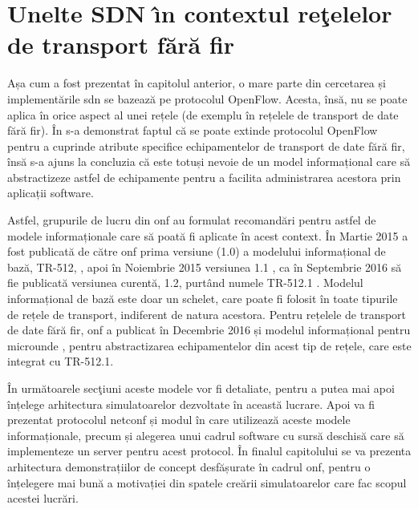 \chapter{Unelte SDN \^{\i}n contextul reţelelor de transport fără fir\label{ch:sdn_in_contextul_wt}}

\graphicspath{ {cap-sdn_in_contextul_wt/figures/} }

Așa cum a fost prezentat în capitolul anterior, o mare parte din cercetarea și implementările \gls{sdn} se bazează pe protocolul OpenFlow. Acesta, însă, nu se poate aplica în orice aspect al unei rețele (de exemplu în rețelele de transport de date fără fir). În \cite{onf2015_poc1} s-a demonstrat faptul că se poate extinde protocolul OpenFlow pentru a cuprinde atribute specifice echipamentelor de transport de date fără fir, însă s-a ajuns la concluzia că este totuși nevoie de un model informațional care să abstractizeze astfel de echipamente pentru a facilita administrarea acestora prin aplicații software. 

Astfel, grupurile de lucru din \gls{onf} au formulat recomandări pentru astfel de modele informaționale care să poată fi aplicate în acest context. În Martie 2015 a fost publicată de către \gls{onf} prima versiune (1.0) a modelului informațional de bază, TR-512, \cite{onftr512v1.0}, apoi în Noiembrie 2015 versiunea 1.1 \cite{onftr512v1.1}, ca în Septembrie 2016 să fie publicată versiunea curentă, 1.2, purtând numele TR-512.1 \cite{onftr512v1.2}. Modelul informațional de bază este doar un schelet, care poate fi folosit în toate tipurile de rețele de transport, indiferent de natura acestora. Pentru rețelele de transport de date fără fir, \gls{onf} a publicat în Decembrie 2016 și modelul informațional pentru microunde \cite{onftr532}, pentru abstractizarea echipamentelor din acest tip de rețele, care este integrat cu TR-512.1. 

În următoarele secţiuni aceste modele vor fi detaliate, pentru a putea mai apoi înțelege arhitectura simulatoarelor dezvoltate în această lucrare. Apoi va fi prezentat protocolul \gls{netconf} și modul în care utilizează aceste modele informaționale, precum și alegerea unui cadrul software cu sursă deschisă care să implementeze un server pentru acest protocol. În finalul capitolului se va prezenta arhitectura demonstrațiilor de concept desfășurate în cadrul \gls{onf}, pentru o înțelegere mai bună a motivației din spatele creării simulatoarelor care fac scopul acestei lucrări.






